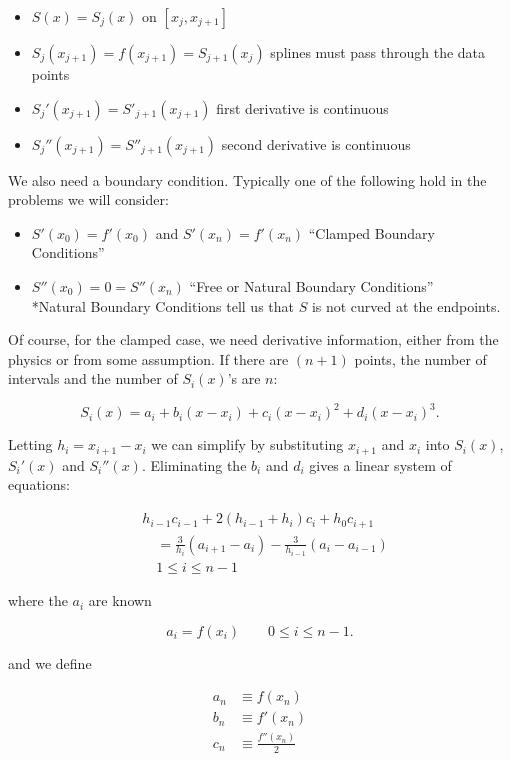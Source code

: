 \documentclass[12pt]{article}
\begin{document}
\begin{itemize}
  \item $S(x) = S_j(x)$ on $[x_j, x_{j+1}]$
  \item $S_j(x_{j+1}) = f(x_{j+1}) = S_{j+1}(x_j)$ splines must pass through the
    data points
  \item $S_j'(x_{j+1}) = S'_{j+1}(x_{j+1})$ first derivative is continuous
  \item $S_j''(x_{j+1}) = S''_{j+1}(x_{j+1})$ second derivative is continuous
\end{itemize}

We also need a boundary condition. Typically one of the following hold in the
problems we will consider: 

\begin{itemize}
  \item $S'(x_0) = f'(x_0)$ and $S'(x_n) = f'(x_n)$ 
    \enquote{Clamped Boundary Conditions}
  \item $S''(x_0) = 0 = S''(x_n)$
    \enquote{Free or Natural Boundary Conditions} \\
    \small{
    *Natural Boundary Conditions tell us that $S$ is not curved at the endpoints.
  }
\end{itemize}

Of course, for the clamped case, we need derivative information, either from the
physics or from some assumption. If there are $(n+1)$ points, the number of
intervals and the number of $S_i(x)$'s are $n:$

\[
  S_i(x) = a_i + b_i (x-x_i) + c_i (x-x_i)^2 + d_i (x-x_i)^3
.\]

Letting $h_i = x_{i+1} - x_i$  we can simplify by substituting $x_{i+1}$ and
$x_i$ into $S_i(x)$, $S_i'(x)$ and $S_i''(x)$. Eliminating the $b_i$ and $d_i$
gives a linear system of equations:

\begin{align*}
&h_{i-1}c_{i-1} + 2(h_{i-1} + h_i)c_i + h_0 c_{i+1} \\
&\quad= \frac{3}{h_i}(a_{i+1}-a_i) - \frac{3}{h_{i-1}}(a_i - a_{i-1})\\
&\quad 1 \leq i \leq n-1
\end{align*}

where the $a_i$ are known

\[
  a_i = f(x_i) \qquad 0 \leq i \leq n-1
.\]

and we define 

\begin{align*}
  a_n &\equiv f(x_n) \\
  b_n &\equiv f'(x_n) \\
  c_n &\equiv \frac{f''(x_n)}{2}
\end{align*}
\end{document}
